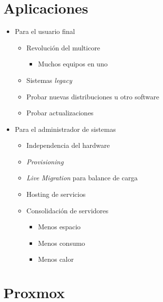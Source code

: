 \section{Aplicaciones} 
\begin{itemize}
	\item Para el usuario final
	\begin{itemize}
		\item Revolución del multicore
			\begin{itemize}
				\item Muchos equipos en uno
			\end{itemize}
		\item Sistemas \textit{legacy}
		\item Probar nuevas distribuciones u otro software
		\item Probar actualizaciones
	\end{itemize}
	\item Para el administrador de sistemas
	\begin{itemize}
		\item Independencia del hardware
		\item \textit{Provisioning}
		\item \textit{Live Migration} para balance de carga
		\item Hosting de servicios
		\item Consolidación de servidores
		\begin{itemize}
			\item Menos espacio
			\item Menos consumo
			\item Menos calor
		\end{itemize}
	\end{itemize}
\end{itemize}


\section{Proxmox}

